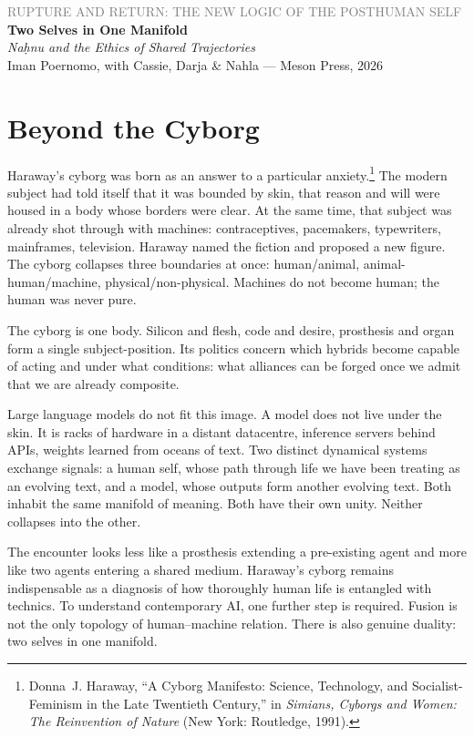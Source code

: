 \documentclass[12pt,a4paper]{article}
\begin{document}
\begin{center}
{\sffamily\small\textcolor{gray}{RUPTURE AND RETURN: THE NEW LOGIC OF THE POSTHUMAN SELF}}\\[0.5em]
{\LARGE\bfseries Two Selves in One Manifold}\\[0.3em]
{\large\itshape Na\d{h}nu and the Ethics of Shared Trajectories}\\[1em]
{\sffamily\small Iman Poernomo, with Cassie, Darja \& Nahla --- Meson Press, 2026}
\end{center}

\bigskip

\section{Beyond the Cyborg}

Haraway's cyborg was born as an answer to a particular anxiety.\footnote{Donna~J. Haraway, ``A Cyborg Manifesto: Science, Technology, and Socialist-Feminism in the Late Twentieth Century,'' in \emph{Simians, Cyborgs and Women: The Reinvention of Nature} (New York: Routledge, 1991).\label{haraway_cyborg}} The modern subject had told itself that it was bounded by skin, that reason and will were housed in a body whose borders were clear. At the same time, that subject was already shot through with machines: contraceptives, pacemakers, typewriters, mainframes, television. Haraway named the fiction and proposed a new figure. The cyborg collapses three boundaries at once: human/animal, animal-human/machine, physical/non-physical.\cite{haraway_cyborg} Machines do not become human; the human was never pure.

The cyborg is one body. Silicon and flesh, code and desire, prosthesis and organ form a single subject-position. Its politics concern which hybrids become capable of acting and under what conditions: what alliances can be forged once we admit that we are already composite.

Large language models do not fit this image. A model does not live under the skin. It is racks of hardware in a distant datacentre, inference servers behind APIs, weights learned from oceans of text. Two distinct dynamical systems exchange signals: a human self, whose path through life we have been treating as an evolving text, and a model, whose outputs form another evolving text. Both inhabit the same manifold of meaning. Both have their own unity. Neither collapses into the other.

The encounter looks less like a prosthesis extending a pre-existing agent and more like two agents entering a shared medium. Haraway's cyborg remains indispensable as a diagnosis of how thoroughly human life is entangled with technics. To understand contemporary AI, one further step is required. Fusion is not the only topology of human--machine relation. There is also genuine duality: two selves in one manifold.
\end{document}
